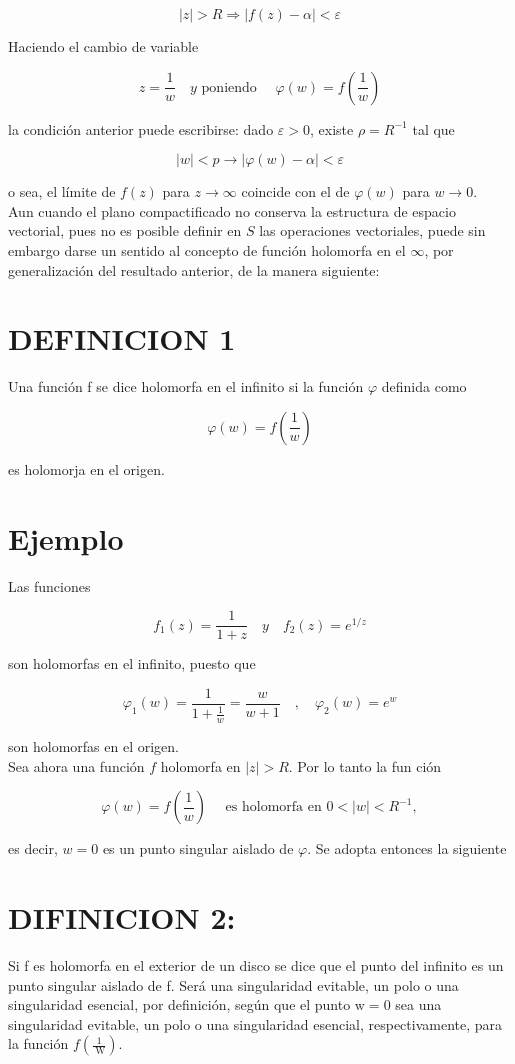 \documentclass[10pt]{article}
\theoremstyle{plain}
\theoremstyle{definition}
\theoremstyle{remark}
\begin{document}
$$
|z|>R \Rightarrow|f(z)-\alpha|<\varepsilon
$$

Haciendo el cambio de variable

$$
z=\frac{1}{w} \quad y \text { poniendo } \quad \varphi(w)=f\left(\frac{1}{w}\right)
$$

la condición anterior puede escribirse: dado $\varepsilon>0$, existe $\rho=R^{-1}$ tal que

$$
|w|<p \rightarrow|\varphi(w)-\alpha|<\varepsilon
$$

o sea, el límite de $f(z)$ para $z \rightarrow \infty$ coincide con el de $\varphi(w)$ para $w \rightarrow 0$.\\
Aun cuando el plano compactificado no conserva la estructura de espacio vectorial, pues no es posible definir en $S$ las operaciones vectoriales, puede sin embargo darse un sentido al concepto de función holomorfa en el $\infty$, por generalización del resultado anterior, de la manera siguiente:

\section*{DEFINICION 1}
Una función f se dice holomorfa en el infinito si la función $\varphi$ definida como

$$
\varphi(w)=f\left(\frac{1}{w}\right)
$$

es holomorja en el origen.

\section*{Ejemplo}
Las funciones

$$
f_{1}(z)=\frac{1}{1+z} \quad y \quad f_{2}(z)=e^{1 / z}
$$

son holomorfas en el infinito, puesto que

$$
\varphi_{1}(w)=\frac{1}{1+\frac{1}{w}}=\frac{w}{w+1} \quad, \quad \varphi_{2}(w)=e^{w}
$$

son holomorfas en el origen.\\
Sea ahora una función $f$ holomorfa en $|z|>R$. Por lo tanto la fun ción

$$
\varphi(w)=f\left(\frac{1}{w}\right) \quad \text { es holomorfa en } 0<|w|<R^{-1},
$$

es decir, $w=0$ es un punto singular aislado de $\varphi$. Se adopta entonces la siguiente

\section*{DIFINICION 2:}
Si f es holomorfa en el exterior de un disco se dice que el punto del infinito es un punto singular aislado de f. Será una singularidad evitable, un polo o una singularidad esencial, por definición, según que el punto $\mathrm{w}=0$ sea una singularidad evitable, un polo o una singularidad esencial, respectivamente, para la función $f\left(\frac{1}{\mathrm{~W}}\right)$.
\end{document}
